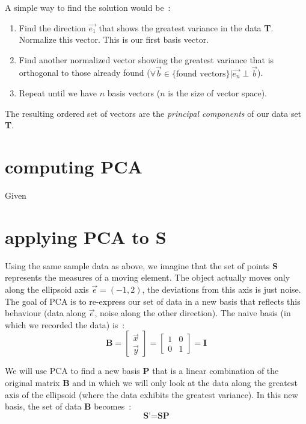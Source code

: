 \documentclass[11pt,twocolumn]{amsart} %
\begin{document}
A simple way to find the solution would be~:
\begin{enumerate}
  \item Find the direction $\vec{e_1}$ that shows the greatest variance in the data \textbf{T}. Normalize this vector. This is our first basis vector.
  \item Find another normalized vector showing the greatest variance that is orthogonal to those already found ($\forall \vec{b}\in \{\text{found vectors}\}|\vec{e_n} \perp \vec{b}$).
  \item Repeat until we have $n$ basis vectors ($n$ is the size of vector space).
\end{enumerate}

The resulting ordered set of vectors are the \emph{principal components} of our data set \textbf{T}.

\section{computing PCA}

Given


\section{applying PCA to \textbf{S}}

Using the same sample data as above, we imagine that the set of points $\textbf{S}$ represents the measures of a moving element. The object actually moves only along the ellipsoid axis $\vec{e} = (-1,2)$, the deviations from this axis is just noise. The goal of PCA is to re-express our set of data in a new basis that reflects this behaviour (data along $\vec{e}$, noise along the other direction). The naive basis (in which we recorded the data) is~:
\begin{equation*}
  \textbf{B} = \begin{bmatrix} \vec{x} \\ \vec{y} \end{bmatrix} = \begin{bmatrix} 1 & 0 \\ 0 & 1 \end{bmatrix} = \textbf{I}
\end{equation*}

We will use PCA to find a new basis $\textbf{P}$ that is a linear combination of the original matrix $\textbf{B}$ and in which we will only look at the data along the greatest axis of the ellipsoid (where the data exhibits the greatest variance). In this new basis, the set of data \textbf{B} becomes~:
\begin{equation*}
  \textbf{S'} = \textbf{S}\textbf{P}
\end{equation*}
\end{document}
